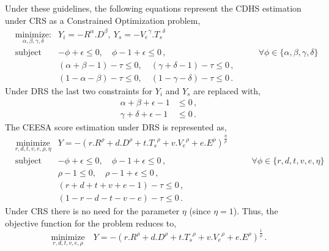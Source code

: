 \documentclass[10pt]{article}
\begin{document}
Under these guidelines, the following equations represent the CDHS estimation under CRS as a Constrained Optimization problem,
\begin{equation}\label{eq:cdhscrs}
  \begin{aligned}
    & \underset{\alpha,\beta,\gamma,\delta}{\text{minimize:}}
    & Y_i = {-}R^\alpha.D^\beta,\ Y_s = {-}{V_e}^\gamma.{T_s}^\delta\\
    & \text{subject to:}
    &  {-}\phi + \epsilon \leq 0,\quad\phi - 1 + \epsilon \leq 0\,, &\quad\quad \forall \phi\in\{\alpha,\beta,\gamma,\delta\}\\
    && (\alpha+\beta-1) - \tau \leq 0,\quad(\gamma+\delta-1) - \tau \leq 0\,,\\
    && (1-\alpha-\beta) - \tau \leq 0,\quad(1-\gamma-\delta) - \tau \leq 0\,.
  \end{aligned}
\end{equation}
Under DRS the last two constraints for $Y_i$ and $Y_s$ are replaced with,
\begin{equation}\label{eq:cdhsdrs}
  \begin{aligned}
    \alpha + \beta + \epsilon - 1 &\leq 0\,,\\
    \gamma + \delta + \epsilon - 1 &\leq 0\,.
  \end{aligned}
\end{equation}
The CEESA score estimation under DRS is represented as,
\begin{equation}\label{eq:ceesadrs}
  \begin{aligned}
    & \underset{r,d,t,v,e,\rho,\eta}{\text{minimize}}
    & Y = {-}{(r.R^\rho+d.D^\rho+t.{T_s}^\rho+v.{V_e}^\rho+e.E^\rho)}^{\frac{\eta}{\rho}}\\
    & \text{subject to}
    &   {-}\phi + \epsilon \leq 0,\quad\phi - 1 + \epsilon \leq 0\,, &\quad\quad \forall \phi\in\{r,d,t,v,e,\eta\}\\
    && \rho - 1 \leq 0,\quad \rho - 1 + \epsilon \leq 0\,,\\
    && (r+d+t+v+e-1) - \tau \leq 0\,,\\
    && (1-r-d-t-v-e) - \tau \leq 0\,.
  \end{aligned}
\end{equation}
Under CRS there is no need for the parameter $\eta$ (since $\eta=1$). Thus, the objective function for the problem reduces to,
\begin{equation}\label{eq:ceesacrs}
  \underset{r,d,t,v,e,\rho}{\text{minimize}}\quad
  Y = {-}{(r.R^\rho+d.D^\rho+t.{T_s}^\rho+v.{V_e}^\rho+e.E^\rho)}^{\frac{1}{\rho}}\,.
\end{equation}
\end{document}
